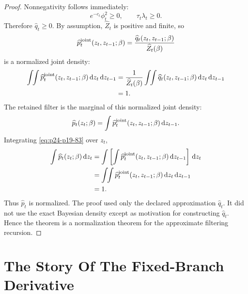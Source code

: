 \documentclass[11pt]{article}
\numberwithin{equation}{section}
\newcommand{\dd}{\,\mathrm d}
\begin{document}
\begin{proof}
Nonnegativity follows immediately:
\begin{equation}
    e^{-c_t}\phi_t^2\ge0,
    \qquad
    \tau_t\lambda_t\ge0.
    \label{eq:p24-p19-80}
\end{equation}
Therefore \(\widehat q_t\ge0\).  By assumption,
\(\widehat Z_t\) is positive and finite, so
\begin{equation}
    \widehat p_t^{\rm joint}(z_t,z_{t-1};\beta)
    =
    \frac{\widehat q_t(z_t,z_{t-1};\beta)}
    {\widehat Z_t(\beta)}
    \label{eq:p24-p19-81}
\end{equation}
is a normalized joint density:
\begin{equation}
\begin{aligned}
    \int\!\!\int
    \widehat p_t^{\rm joint}(z_t,z_{t-1};\beta)
    \dd z_t\dd z_{t-1}
    &=
    \frac{1}{\widehat Z_t(\beta)}
    \int\!\!\int
    \widehat q_t(z_t,z_{t-1};\beta)
    \dd z_t\dd z_{t-1}\\
    &=
    1.
\end{aligned}
\label{eq:p24-p19-82}
\end{equation}
The retained filter is the marginal of this normalized joint density:
\begin{equation}
    \widehat p_t(z_t;\beta)
    =
    \int
    \widehat p_t^{\rm joint}(z_t,z_{t-1};\beta)
    \dd z_{t-1}.
    \label{eq:p24-p19-83}
\end{equation}
Integrating \eqref{eq:p24-p19-83} over \(z_t\),
\begin{equation}
\begin{aligned}
    \int \widehat p_t(z_t;\beta)\dd z_t
    &=
    \int
    \left[
    \int \widehat p_t^{\rm joint}(z_t,z_{t-1};\beta)
    \dd z_{t-1}
    \right]\dd z_t\\
    &=
    \int\!\!\int
    \widehat p_t^{\rm joint}(z_t,z_{t-1};\beta)
    \dd z_t\dd z_{t-1}\\
    &=
    1.
\end{aligned}
\label{eq:p24-p19-84}
\end{equation}
Thus \(\widehat p_t\) is normalized.  The proof used only the declared
approximation \(\widehat q_t\).  It did not use the exact Bayesian density
except as motivation for constructing \(\widehat q_t\).  Hence the theorem is a
normalization theorem for the approximate filtering recursion.
\end{proof}

\section{The Story Of The Fixed-Branch Derivative}
\end{document}
